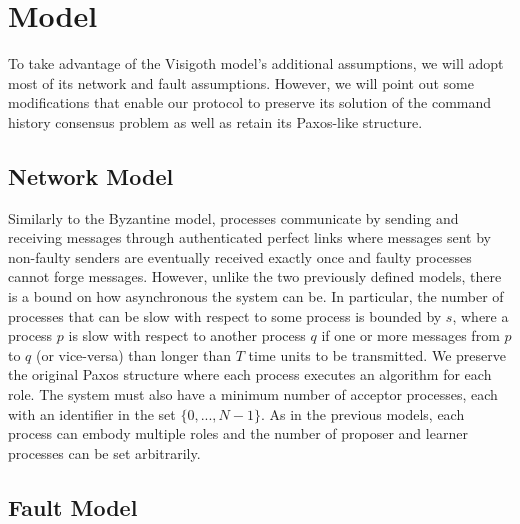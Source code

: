 \section{Model} \label{vft_model}
To take advantage of the Visigoth model's additional assumptions, we will adopt most of its network and fault assumptions. However, we will point out some modifications that enable our protocol to preserve its solution of the command history consensus problem as well as retain its Paxos-like structure. 

\subsection{Network Model}

Similarly to the Byzantine model, processes communicate by sending and receiving messages through authenticated perfect links where messages sent by non-faulty senders are eventually received exactly once and faulty processes cannot forge messages. However, unlike the two previously defined models, there is a bound on how asynchronous the system can be. In particular, the number of processes that can be slow with respect to some process is bounded by $s$, where a process $p$ is slow with respect to another process $q$ if one or more messages from $p$ to $q$ (or vice-versa) than longer than $T$ time units to be transmitted. We preserve the original Paxos structure where each process executes an algorithm for each role. The system must also have a minimum number of acceptor processes, each with an identifier in the set $\{0,...,N-1\}$. As in the previous models, each process can embody multiple roles and the number of proposer and learner processes can be set arbitrarily.

\subsection{Fault Model}

